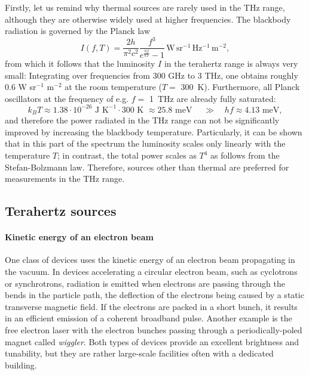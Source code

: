Firstly, let us remind why thermal sources are rarely used in the THz range, although they are otherwise widely used at higher frequencies. The blackbody radiation is governed by the Planck law %
\begin{equation}I(f, T) = \frac{2 h}{\pi^2 c^2}\frac{f^3}{e^{\frac{h f}{kT}}-1} \mathrm{\,W\,sr^{-1}\,Hz^{-1}\,m^{-2}}, \label{eq_planck}\end{equation}
from which it follows that the luminosity $I$ in the terahertz range is always very small: Integrating over frequencies from 300 GHz to 3 THz, one obtains roughly 0.6 W sr$^{-1}$ m$^{-2}$ at the room temperature ($T=$ 300~K).  Furthermore, all Planck oscillators at the frequency of e.g. $f =$ 1~THz are already fully saturated:
$$k_B T \approx 1.38\cdot 10^{-26} \text{ J K}^{-1} \cdot 300 \text{ K~} \approx 25.8 \text{ meV } \quad\gg\quad h f \approx 4.13 \text{ meV}, $$
and therefore the power radiated in the THz range can not be significantly improved by increasing the blackbody temperature. Particularly, it can be shown that in this part of the spectrum the luminosity scales only linearly with the temperature $T$; in contrast, the total power scales as $T^{4}$ as follows from the Stefan-Bolzmann law. Therefore, sources other than thermal are preferred for measurements in the THz range.

\subsection{Terahertz sources}
\paragraph{Kinetic energy of an electron beam} %
One class of devices uses the kinetic energy of an electron beam propagating in the vacuum. In devices accelerating a circular electron beam, such as cyclotrons or synchrotrons, radiation is emitted when electrons are passing through the bends in the particle path, the deflection of the electrons being caused by a static transverse magnetic field. If the electrons are packed in a short bunch, it results in an efficient emission of a coherent broadband pulse. %
Another example is the free electron laser with the electron bunches %
passing through a periodically-poled magnet called \textit{wiggler}. 
Both types of devices provide an excellent brightness and tunability, but they are rather large-scale facilities often with a dedicated building. 


